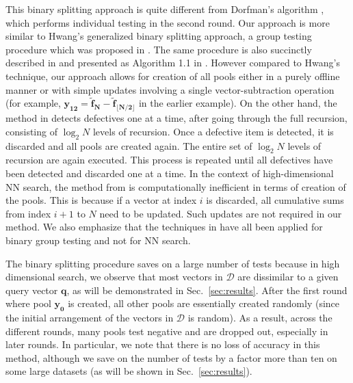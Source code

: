 \documentclass[sigconf, anonymous, review]{acmart}
\begin{document}
This binary splitting approach is quite different from Dorfman's algorithm \cite{Dorfman1943}, which performs individual testing in the second round. Our approach is more similar to Hwang's generalized binary splitting approach, a group testing procedure which was proposed in \cite{Hwang1972}. The same procedure is also succinctly described in \cite{gbs_wiki} and presented as Algorithm 1.1 in \cite{Aldridge2019}. However compared to Hwang's technique, our approach allows for creation of all pools either in a purely offline manner or with simple updates involving a single vector-subtraction operation (for example, $\boldsymbol{y_{12}} = \boldsymbol{\widetilde{f}_N} - \boldsymbol{\widetilde{f}_{\lfloor N/2 \rfloor}}$ in the earlier example). On the other hand, the method in \cite{Hwang1972} detects defectives one at a time, after going through the full recursion, consisting of $\log_2 N$ levels of recursion. Once a defective item is detected, it is discarded and all pools are created again. The entire set of $\log_2 N$ levels of recursion are again executed. This process is repeated until all defectives have been detected and discarded one at a time. In the context of high-dimensional NN search, the method from \cite{Hwang1972} is computationally inefficient in terms of creation of the pools. This is because if a vector at index $i$ is discarded, all cumulative sums from index $i+1$ to $N$ need to be updated. Such updates are not required in our method. We also emphasize that the techniques in \cite{Dorfman1943,Aldridge2019,Hwang1972,Li1962} have all been applied for binary group testing and not for NN search. 

The binary splitting procedure saves on a large number of tests because in high dimensional search, we observe that most vectors in $\mathcal{D}$ are dissimilar to a given query vector $\boldsymbol{q}$, as will be demonstrated in Sec.~\ref{sec:results}. After the first round where pool $\boldsymbol{y_0}$ is created, all other pools are essentially created randomly (since the initial arrangement of the vectors in $\mathcal{D}$ is random). As a result, across the different rounds, many pools test negative and are dropped out, especially in later rounds. In particular, we note that there is no loss of accuracy in this method, although we save on the number of tests by a factor more than ten on some large datasets (as will be shown in Sec.~\ref{sec:results}). 
\end{document}
